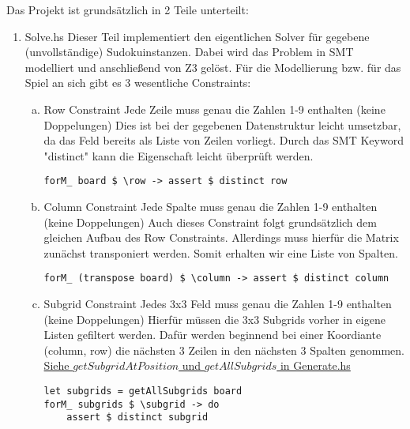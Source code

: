 Das Projekt ist grundsätzlich in 2 Teile unterteilt:
\begin{enumerate}[(1)]
    \item Solve.hs \newline
    Dieser Teil implementiert den eigentlichen Solver für gegebene (unvollständige) Sudokuinstanzen. Dabei wird das Problem in SMT modelliert und anschließend von Z3 gelöst. Für die Modellierung bzw. für das Spiel an sich gibt es 3 wesentliche Constraints:
        \begin{enumerate}[(a)]
            \item Row Constraint \newline
            Jede Zeile muss genau die Zahlen 1-9 enthalten (keine Doppelungen)\newline
            Dies ist bei der gegebenen Datenstruktur leicht umsetzbar, da das Feld bereits als Liste von Zeilen vorliegt. Durch das SMT Keyword "distinct" kann die Eigenschaft leicht überprüft werden. \newline
            \begin{lstlisting}
forM_ board $ \row -> assert $ distinct row
            \end{lstlisting}
            \item Column Constraint \newline
            Jede Spalte muss genau die Zahlen 1-9 enthalten (keine Doppelungen) \newline
            Auch dieses Constraint folgt grundsätzlich dem gleichen Aufbau des Row Constraints. Allerdings muss hierfür die Matrix zunächst transponiert werden. Somit erhalten wir eine Liste von Spalten.
            \begin{lstlisting}
forM_ (transpose board) $ \column -> assert $ distinct column
            \end{lstlisting}
            \item Subgrid Constraint \newline
            Jedes 3x3 Feld muss genau die Zahlen 1-9 enthalten (keine Doppelungen) \newline
            Hierfür müssen die 3x3 Subgrids vorher in eigene Listen gefiltert werden. Dafür werden beginnend bei einer Koordiante (column, row) die nächsten 3 Zeilen in den nächsten 3 Spalten genommen. \underline{Siehe \(getSubgridAtPosition\) und \(getAllSubgrids\) in Generate.hs}
            \begin{lstlisting}
let subgrids = getAllSubgrids board
forM_ subgrids $ \subgrid -> do
    assert $ distinct subgrid
            \end{lstlisting}
        \end{enumerate}


\end{enumerate}
